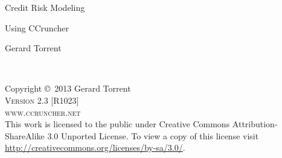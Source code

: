 \documentclass[11pt,fleqn]{book} %
\begin{document}

\begingroup
\thispagestyle{empty}
\centering
\vspace*{8cm}
\par\normalfont\fontsize{35}{35}\sffamily\selectfont
Credit Risk Modeling \par %
\par\normalfont\fontsize{25}{25}\sffamily\selectfont
Using CCruncher\par
\vspace*{2cm}
{\Huge Gerard Torrent}\par %
\endgroup


\newpage
~\vfill
\thispagestyle{empty}

\noindent Copyright \copyright\ 2013 Gerard Torrent\\ %

\noindent \textsc{Version 2.3 [R1023]}\\ 

\noindent \textsc{www.ccruncher.net}\\ %

\noindent 
This work is licensed to the public under Creative Commons Attribution-ShareAlike 3.0 Unported License. 
To view a copy of this license visit \url{http://creativecommons.org/licenses/by-sa/3.0/}.




\pagestyle{empty} %

\tableofcontents %

\cleardoublepage %
\end{document}

